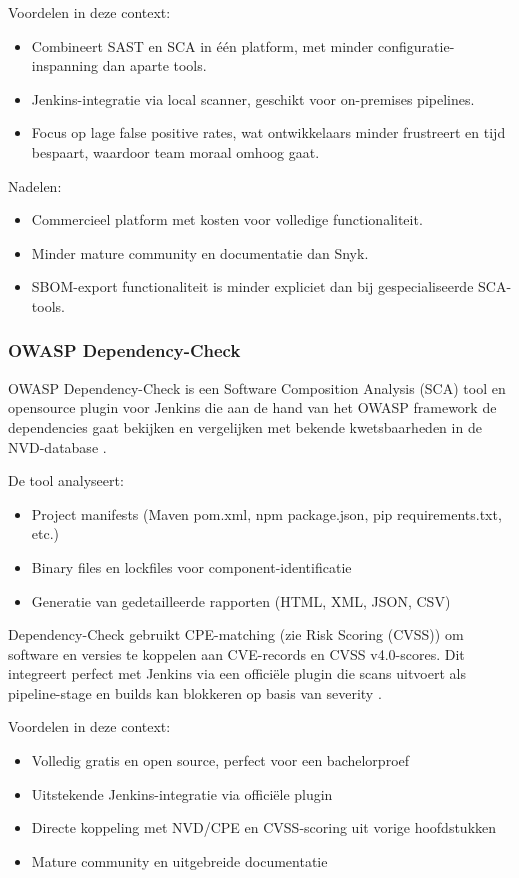 Voordelen in deze context:
\begin{itemize}
  \item Combineert SAST en SCA in één platform, met minder configuratie-\\inspanning dan aparte tools.
  \item Jenkins-integratie via local scanner, geschikt voor on-premises pipelines.
  \item Focus op lage false positive rates, wat ontwikkelaars minder frustreert en tijd bespaart, waardoor team moraal omhoog gaat.
\end{itemize}
Nadelen:
\begin{itemize}
  \item Commercieel platform met kosten voor volledige functionaliteit.
  \item Minder mature community en documentatie dan Snyk.
  \item SBOM-export functionaliteit is minder expliciet dan bij gespecialiseerde SCA-tools.
\end{itemize}

\subsubsection{OWASP Dependency-Check}

OWASP Dependency-Check is een Software Composition Analysis (SCA) tool en opensource plugin voor Jenkins die aan de hand van het OWASP framework de dependencies gaat bekijken en vergelijken met bekende kwetsbaarheden in de NVD-database \autocite{Jenkins2024}.

De tool analyseert:
\begin{itemize}
  \item Project manifests (Maven pom.xml, npm package.json, pip requirements.txt, etc.)
  \item Binary files en lockfiles voor component-identificatie
  \item Generatie van gedetailleerde rapporten (HTML, XML, JSON, CSV)
\end{itemize}
Dependency-Check gebruikt CPE-matching (zie Risk Scoring (CVSS)) om software en versies te koppelen aan CVE-records en CVSS v4.0-scores. Dit integreert perfect met Jenkins via een officiële plugin die scans uitvoert als pipeline-stage en builds kan blokkeren op basis van severity \autocite{Jenkins2024}.

Voordelen in deze context:
\begin{itemize}
  \item Volledig gratis en open source, perfect voor een bachelorproef
  \item Uitstekende Jenkins-integratie via officiële plugin
  \item Directe koppeling met NVD/CPE en CVSS-scoring uit vorige hoofdstukken
  \item Mature community en uitgebreide documentatie
\end{itemize}

